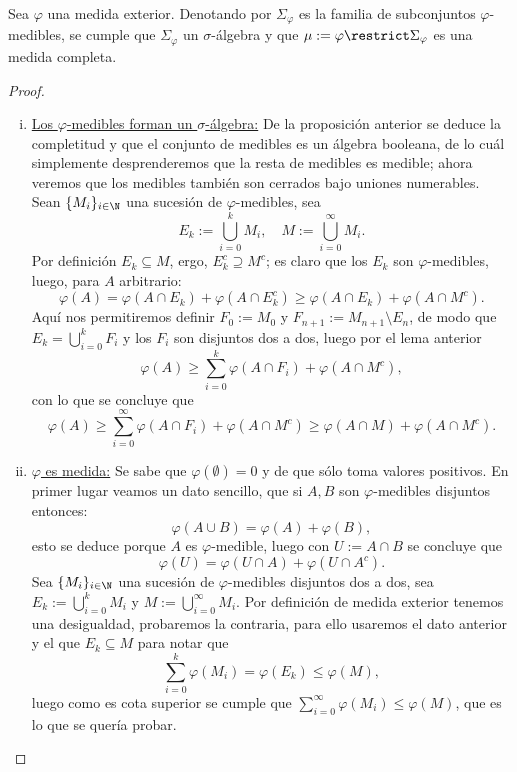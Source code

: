 \begin{thmi}
	Sea $\varphi$ una medida exterior.
	Denotando por $\Sigma_\varphi$ es la familia de subconjuntos $\varphi$-medibles,
	se cumple que $\Sigma_\varphi$ un $\sigma$-álgebra y que $\mu := \varphi\restrict\Sigma_\varphi$ es una medida completa.
\end{thmi}
\begin{proof}
	\begin{enumerate}[i)]
		\item \underline{Los $\varphi$-medibles forman un $\sigma$-álgebra:}
			De la proposición anterior se deduce la completitud y que el conjunto de medibles es un álgebra booleana, de lo cuál simplemente desprenderemos que la resta de medibles es medible; ahora veremos que los medibles también son cerrados bajo uniones numerables.
			Sean $\{M_i\}_{i\in\N}$ una sucesión de $\varphi$-medibles, sea
			$$ E_k := \bigcup_{i=0}^k M_i,\quad M := \bigcup_{i=0}^\infty M_i. $$
			Por definición $E_k \subseteq M$, ergo, $E_k^c \supseteq M^c$; es claro que los $E_k$ son $\varphi$-medibles, luego, para $A$ arbitrario:
			$$ \varphi(A) = \varphi(A\cap E_k) + \varphi(A\cap E_k^c) \ge \varphi(A\cap E_k) + \varphi(A\cap M^c). $$
			Aquí nos permitiremos definir $F_0 := M_0$ y $F_{n+1} := M_{n+1}\setminus E_n$, de modo que $E_k = \bigcup_{i=0}^k F_i$ y los $F_i$ son disjuntos dos a dos, luego por el lema anterior
			$$ \varphi(A) \ge \sum_{i=0}^k\varphi(A\cap F_i) + \varphi(A\cap M^c), $$
			con lo que se concluye que
			$$ \varphi(A) \ge \sum_{i=0}^\infty\varphi(A\cap F_i) + \varphi(A\cap M^c) \ge \varphi(A\cap M) + \varphi(A\cap M^c). $$

		\item \underline{$\varphi$ es medida:}
			Se sabe que $\varphi(\emptyset) = 0$ y de que sólo toma valores positivos.
			En primer lugar veamos un dato sencillo, que si $A,B$ son $\varphi$-medibles disjuntos entonces:
			$$ \varphi(A\cup B) = \varphi(A) + \varphi(B), $$
			esto se deduce porque $A$ es $\varphi$-medible, luego con $U := A\cap B$ se concluye que
			$$ \varphi(U) = \varphi(U\cap A) + \varphi(U\cap A^c). $$
			Sea $\{M_i\}_{i\in\N}$ una sucesión de $\varphi$-medibles disjuntos dos a dos, sea $ E_k := \bigcup_{i=0}^k M_i $ y $ M := \bigcup_{i=0}^\infty M_i $.
			Por definición de medida exterior tenemos una desigualdad, probaremos la contraria, para ello usaremos el dato anterior y el que $E_k\subseteq M$ para notar que
			$$ \sum_{i=0}^k \varphi(M_i) = \varphi(E_k) \le \varphi(M), $$
			luego como es cota superior se cumple que $\sum_{i=0}^\infty \varphi(M_i) \le \varphi(M)$, que es lo que se quería probar. \qedhere
	\end{enumerate}
\end{proof}

